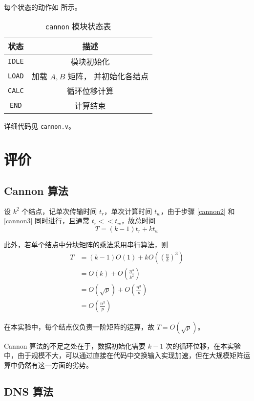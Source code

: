 \documentclass{zjureport-zh}
\begin{document}
\par 每个状态的动作如 所示。
\begin{table}[h]
	\centering
	\caption{\texttt{cannon} 模块状态表} \label{cannon_statetab}
	\vspace{1ex}
	\begin{tabular}{cc}
		\hline
		状态 & 描述 \\
		\hline
		\texttt{IDLE} & 模块初始化 \\
		\hline
		\texttt{LOAD} & \makecell{加载 $A,B$ 矩阵，\\并初始化各结点} \\
		\hline
		\texttt{CALC} & 循环位移计算 \\
		\hline
		\texttt{END} & 计算结束 \\
		\hline
	\end{tabular}
\end{table}

\par 详细代码见 \texttt{cannon.v}。

\section{评价}
\subsection{Cannon 算法}
\par 设 $k^2$ 个结点，记单次传输时间 $t_r$，单次计算时间 $t_w$，由于步骤 \ref{cannon2} 和 \ref{cannon3} 同时进行，且通常 $t_r << t_w$，故总时间
$$
	T = (k-1)t_r + kt_w
$$
\par 此外，若单个结点中分块矩阵的乘法采用串行算法，则
\begin{align*}
	T &= (k-1)O(1) + kO((\frac{n}{k})^3) \\
	  &= O(k) + O(\frac{n^3}{k^2}) \\
	  &= O(\sqrt{p}) + O(\frac{n^3}{p}) \\
	  &= O(\frac{n^3}{p})
\end{align*}
\par 在本实验中，每个结点仅负责一阶矩阵的运算，故 $T = O(\sqrt{p})$。
\par Cannon 算法的不足之处在于，数据初始化需要 $k-1$ 次的循环位移，在本实验中，由于规模不大，可以通过直接在代码中交换输入实现加速，但在大规模矩阵运算中仍然有这一方面的劣势。

\subsection{DNS 算法}
\end{document}
